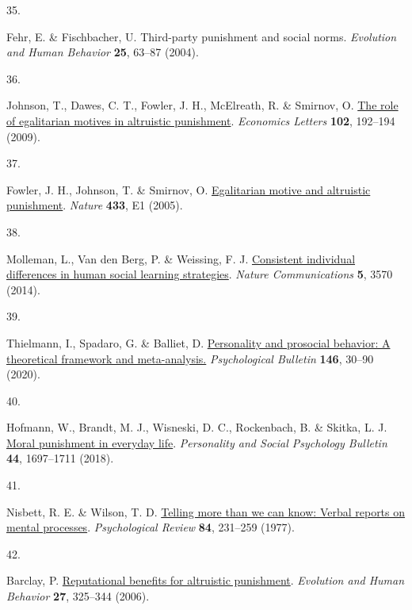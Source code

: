 \documentclass[
  man,floatsintext]{apa6}
\newlength{\cslhangindent}
\newlength{\csllabelwidth}
\newlength{\cslentryspacingunit} %
\newenvironment{CSLReferences}[2] %
 {%
  \setlength{\parindent}{0pt}
  \ifodd #1
  \let\oldpar\par
  \def\par{\hangindent=\cslhangindent\oldpar}
  \fi
  \setlength{\parskip}{#2\cslentryspacingunit}
 }%
 {}
\newcommand{\CSLLeftMargin}[1]{\parbox[t]{\csllabelwidth}{#1}}
\newcommand{\CSLRightInline}[1]{\parbox[t]{\linewidth - \csllabelwidth}{#1}\break}
\begin{document}
\begin{CSLReferences}{0}{0}
\leavevmode{}%
\CSLLeftMargin{35. }%
\CSLRightInline{Fehr, E. \& Fischbacher, U. Third-party punishment and social norms. \emph{Evolution and Human Behavior} \textbf{25}, 63--87 (2004).}

\leavevmode{}%
\CSLLeftMargin{36. }%
\CSLRightInline{Johnson, T., Dawes, C. T., Fowler, J. H., McElreath, R. \& Smirnov, O. \href{https://doi.org/10.1016/j.econlet.2009.01.003}{The role of egalitarian motives in altruistic punishment}. \emph{Economics Letters} \textbf{102}, 192--194 (2009).}

\leavevmode{}%
\CSLLeftMargin{37. }%
\CSLRightInline{Fowler, J. H., Johnson, T. \& Smirnov, O. \href{https://doi.org/10.1038/nature03256}{Egalitarian motive and altruistic punishment}. \emph{Nature} \textbf{433}, E1 (2005).}

\leavevmode{}%
\CSLLeftMargin{38. }%
\CSLRightInline{Molleman, L., Van den Berg, P. \& Weissing, F. J. \href{https://doi.org/10.1038/ncomms4570}{Consistent individual differences in human social learning strategies}. \emph{Nature Communications} \textbf{5}, 3570 (2014).}

\leavevmode{}%
\CSLLeftMargin{39. }%
\CSLRightInline{Thielmann, I., Spadaro, G. \& Balliet, D. \href{https://doi.org/10.1037/bul0000217}{Personality and prosocial behavior: A theoretical framework and meta-analysis.} \emph{Psychological Bulletin} \textbf{146}, 30--90 (2020).}

\leavevmode{}%
\CSLLeftMargin{40. }%
\CSLRightInline{Hofmann, W., Brandt, M. J., Wisneski, D. C., Rockenbach, B. \& Skitka, L. J. \href{https://doi.org/10.1177/0146167218775075}{Moral punishment in everyday life}. \emph{Personality and Social Psychology Bulletin} \textbf{44}, 1697--1711 (2018).}

\leavevmode{}%
\CSLLeftMargin{41. }%
\CSLRightInline{Nisbett, R. E. \& Wilson, T. D. \href{https://doi.org/10.1037/0033-295X.84.3.231}{Telling more than we can know: Verbal reports on mental processes}. \emph{Psychological Review} \textbf{84}, 231--259 (1977).}

\leavevmode{}%
\CSLLeftMargin{42. }%
\CSLRightInline{Barclay, P. \href{https://doi.org/10.1016/j.evolhumbehav.2006.01.003}{Reputational benefits for altruistic punishment}. \emph{Evolution and Human Behavior} \textbf{27}, 325--344 (2006).}


\end{CSLReferences}
\end{document}
